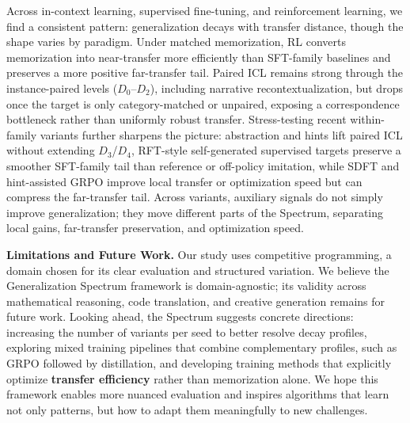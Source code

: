 \documentclass[]{bytedance_seed}
\theoremstyle{plain}
\theoremstyle{definition}
\theoremstyle{remark}
\begin{document}
Across in-context learning, supervised fine-tuning, and reinforcement learning, we find a consistent pattern: generalization decays with transfer distance, though the shape varies by paradigm. Under matched memorization, RL converts memorization into near-transfer more efficiently than SFT-family baselines and preserves a more positive far-transfer tail. Paired ICL remains strong through the instance-paired levels ($D_0$--$D_2$), including narrative recontextualization, but drops once the target is only category-matched or unpaired, exposing a correspondence bottleneck rather than uniformly robust transfer. Stress-testing recent within-family variants further sharpens the picture: abstraction and hints lift paired ICL without extending $D_3$/$D_4$, RFT-style self-generated supervised targets preserve a smoother SFT-family tail than reference or off-policy imitation, while SDFT and hint-assisted GRPO improve local transfer or optimization speed but can compress the far-transfer tail. Across variants, auxiliary signals do not simply improve generalization; they move different parts of the Spectrum, separating local gains, far-transfer preservation, and optimization speed.

\textbf{Limitations and Future Work.} Our study uses competitive programming, a domain chosen for its clear evaluation and structured variation. We believe the Generalization Spectrum framework is domain-agnostic; its validity across mathematical reasoning, code translation, and creative generation remains for future work. Looking ahead, the Spectrum suggests concrete directions: increasing the number of variants per seed to better resolve decay profiles, exploring mixed training pipelines that combine complementary profiles, such as GRPO followed by distillation, and developing training methods that explicitly optimize \textbf{transfer efficiency} rather than memorization alone. We hope this framework enables more nuanced evaluation and inspires algorithms that learn not only patterns, but how to adapt them meaningfully to new challenges.
\end{document}
